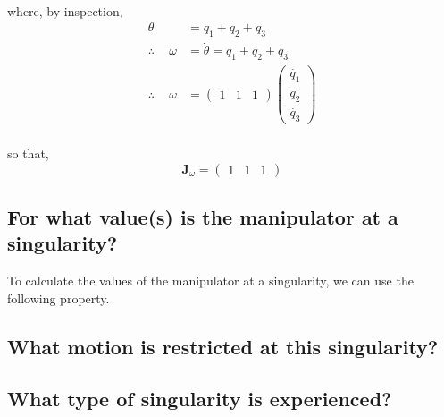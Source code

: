 \\ where, by inspection,
\begin{equation*}
    \begin{split}
        \theta                         & = q_1 + q_2 + q_3                                                                                           \\
        \therefore \hspace{14pt}\omega & = \dot{\theta} = \dot{q_1} + \dot{q_2} + \dot{q_3}                                                          \\
        \therefore \hspace{14pt}\omega & = \begin{pmatrix} 1 & 1 & 1 \end{pmatrix} \begin{pmatrix} \dot{q_1} \\ \dot{q_2} \\ \dot{q_3} \end{pmatrix}
    \end{split}
\end{equation*}
\\ so that,
\begin{equation*}
    \textbf{J$_\omega$} = \begin{pmatrix} 1 & 1 & 1 \end{pmatrix}
\end{equation*}
\subsection{For what value(s) is the manipulator at a singularity?}
To calculate the values of the manipulator at a singularity, we can use the following property.

\subsection{What motion is restricted at this singularity?}

\subsection{What type of singularity is experienced?}